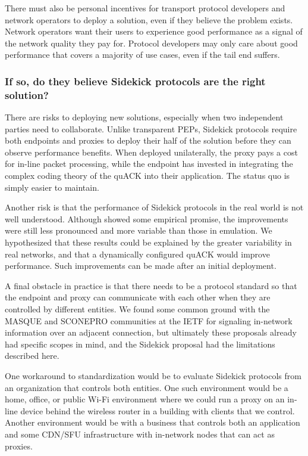 There must also be personal incentives for transport protocol developers and
network operators to deploy a solution, even if they believe the problem
exists. Network operators want their users to experience good performance as a
signal of the network quality they pay for. Protocol developers may only care
about good performance that covers a majority of use cases, even if the tail
end suffers.

\subsubsection{If so, do they believe Sidekick protocols are the right
 solution?}

There are risks to deploying new solutions, especially when two independent
parties need to collaborate. Unlike transparent PEPs, Sidekick protocols
require both endpoints and proxies to deploy their half of the solution before
they can observe performance benefits. When deployed unilaterally, the proxy
pays a cost for in-line packet processing, while the endpoint has invested in
integrating the complex coding theory of the quACK into their application. The
status quo is simply easier to maintain.

Another risk is that the performance of Sidekick protocols in the real world is
not well understood. Although  showed some
empirical promise, the improvements were still less pronounced and more
variable than those in emulation. We hypothesized that these results could be
explained by the greater variability in real networks, and that a dynamically
configured quACK would improve performance. Such improvements can be made
after an initial deployment.

A final obstacle in practice is that there needs to be a protocol standard so
that the endpoint and proxy can communicate with each other when they are
controlled by different entities. We found some common ground with the MASQUE
and SCONEPRO communities at the IETF for signaling in-network information over
an adjacent connection, but ultimately these proposals already had specific
scopes in mind, and the Sidekick proposal had the limitations described here.

One workaround to standardization would be to evaluate Sidekick protocols from
an organization that controls both entities. One such environment would be a
home, office, or public Wi-Fi environment where we could run a proxy on an
in-line device behind the wireless router in a building with clients that we
control. Another environment would be with a business that controls both an
application and some CDN/SFU infrastructure with in-network nodes that can act
as proxies.

